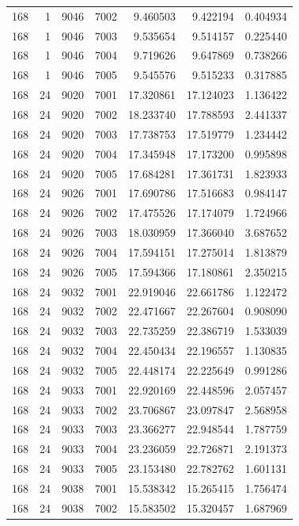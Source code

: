 \begin{table}
\begin{tabular}{rrrrrrr}
168 & 1 & 9046 & 7002 & 9.460503 & 9.422194 & 0.404934 \\
168 & 1 & 9046 & 7003 & 9.535654 & 9.514157 & 0.225440 \\
168 & 1 & 9046 & 7004 & 9.719626 & 9.647869 & 0.738266 \\
168 & 1 & 9046 & 7005 & 9.545576 & 9.515233 & 0.317885 \\
168 & 24 & 9020 & 7001 & 17.320861 & 17.124023 & 1.136422 \\
168 & 24 & 9020 & 7002 & 18.233740 & 17.788593 & 2.441337 \\
168 & 24 & 9020 & 7003 & 17.738753 & 17.519779 & 1.234442 \\
168 & 24 & 9020 & 7004 & 17.345948 & 17.173200 & 0.995898 \\
168 & 24 & 9020 & 7005 & 17.684281 & 17.361731 & 1.823933 \\
168 & 24 & 9026 & 7001 & 17.690786 & 17.516683 & 0.984147 \\
168 & 24 & 9026 & 7002 & 17.475526 & 17.174079 & 1.724966 \\
168 & 24 & 9026 & 7003 & 18.030959 & 17.366040 & 3.687652 \\
168 & 24 & 9026 & 7004 & 17.594151 & 17.275014 & 1.813879 \\
168 & 24 & 9026 & 7005 & 17.594366 & 17.180861 & 2.350215 \\
168 & 24 & 9032 & 7001 & 22.919046 & 22.661786 & 1.122472 \\
168 & 24 & 9032 & 7002 & 22.471667 & 22.267604 & 0.908090 \\
168 & 24 & 9032 & 7003 & 22.735259 & 22.386719 & 1.533039 \\
168 & 24 & 9032 & 7004 & 22.450434 & 22.196557 & 1.130835 \\
168 & 24 & 9032 & 7005 & 22.448174 & 22.225649 & 0.991286 \\
168 & 24 & 9033 & 7001 & 22.920169 & 22.448596 & 2.057457 \\
168 & 24 & 9033 & 7002 & 23.706867 & 23.097847 & 2.568958 \\
168 & 24 & 9033 & 7003 & 23.366277 & 22.948544 & 1.787759 \\
168 & 24 & 9033 & 7004 & 23.236059 & 22.726871 & 2.191373 \\
168 & 24 & 9033 & 7005 & 23.153480 & 22.782762 & 1.601131 \\
168 & 24 & 9038 & 7001 & 15.538342 & 15.265415 & 1.756474 \\
168 & 24 & 9038 & 7002 & 15.583502 & 15.320457 & 1.687969 \\

\end{tabular}
\end{table}
